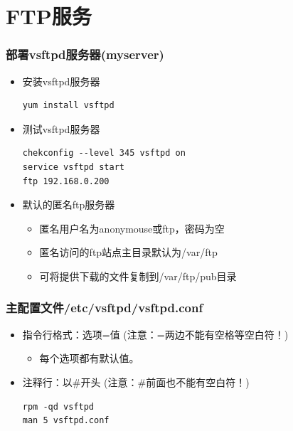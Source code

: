 \documentclass[xcolor=svgnames,presentation]{beamer}
\begin{document}
\section{FTP服务}
\label{sec-3}
\begin{frame}[fragile]
\frametitle{部署vsftpd服务器(myserver)}
\label{sec-3-1}
\begin{itemize}

\item 安装vsftpd服务器\\
\label{sec-3-1-1}%
\begin{verbatim}
yum install vsftpd
\end{verbatim}

\item 测试vsftpd服务器\\
\label{sec-3-1-2}%
\begin{verbatim}
chekconfig --level 345 vsftpd on
service vsftpd start
ftp 192.168.0.200
\end{verbatim}

\item 默认的匿名ftp服务器
\label{sec-3-1-3}%
\begin{itemize}

\item 匿名用户名为anonymouse或ftp，密码为空
\label{sec-3-1-3-1}%

\item 匿名访问的ftp站点主目录默认为/var/ftp
\label{sec-3-1-3-2}%

\item 可将提供下载的文件复制到/var/ftp/pub目录
\label{sec-3-1-3-3}%
\end{itemize} %
\end{itemize} %
\end{frame}
\begin{frame}[fragile]
\frametitle{主配置文件/etc/vsftpd/vsftpd.conf}
\label{sec-3-2}
\begin{itemize}

\item 指令行格式：选项=值 (注意：=两边不能有空格等空白符！)
\label{sec-3-2-1}%
\begin{itemize}

\item 每个选项都有默认值。
\label{sec-3-2-1-1}%
\end{itemize} %

\item 注释行：以\#开头 (注意：\#前面也不能有空白符！)\\
\label{sec-3-2-2}%
\begin{verbatim}
rpm -qd vsftpd
man 5 vsftpd.conf
\end{verbatim}
\end{itemize} %
\end{frame}
\end{document}
